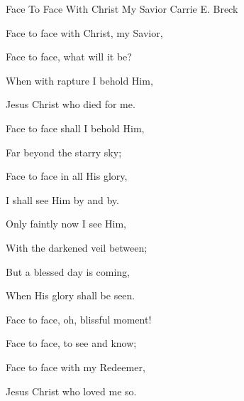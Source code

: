 \documentclass[12pt]{book}
\begin{document}
\begin{song}{Face To Face With Christ My Savior}{}
  {\SBPubDom}
  {Carrie E. Breck}
  {}
  {}

  \begin{SBVerse}
    Face to face with Christ, my Savior,

    Face to face, what will it be?

    When with rapture I behold Him,

    Jesus Christ who died for me.
  \end{SBVerse}

  \begin{SBOpGroup}
    Face to face shall I behold Him,

    Far beyond the starry sky;

    Face to face in all His glory,

    I shall see Him by and by.
  \end{SBOpGroup}

  \begin{SBVerse}
    Only faintly now I see Him,

    With the darkened veil between;

    But a blessed day is coming,

    When His glory shall be seen.
  \end{SBVerse}

  \begin{SBVerse}
    Face to face, oh, blissful moment!

    Face to face, to see and know;

    Face to face with my Redeemer,

    Jesus Christ who loved me so.
  \end{SBVerse}
\end{song}
\end{document}
